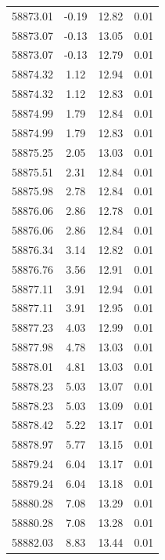 \begin{longtable}{|c|c|c|c|}
 58873.01 &   -0.19 &       12.82 &          0.01 \\
 58873.07 &   -0.13 &       13.05 &          0.01 \\
 58873.07 &   -0.13 &       12.79 &          0.01 \\
 58874.32 &    1.12 &       12.94 &          0.01 \\
 58874.32 &    1.12 &       12.83 &          0.01 \\
 58874.99 &    1.79 &       12.84 &          0.01 \\
 58874.99 &    1.79 &       12.83 &          0.01 \\
 58875.25 &    2.05 &       13.03 &          0.01 \\
 58875.51 &    2.31 &       12.84 &          0.01 \\
 58875.98 &    2.78 &       12.84 &          0.01 \\
 58876.06 &    2.86 &       12.78 &          0.01 \\
 58876.06 &    2.86 &       12.84 &          0.01 \\
 58876.34 &    3.14 &       12.82 &          0.01 \\
 58876.76 &    3.56 &       12.91 &          0.01 \\
 58877.11 &    3.91 &       12.94 &          0.01 \\
 58877.11 &    3.91 &       12.95 &          0.01 \\
 58877.23 &    4.03 &       12.99 &          0.01 \\
 58877.98 &    4.78 &       13.03 &          0.01 \\
 58878.01 &    4.81 &       13.03 &          0.01 \\
 58878.23 &    5.03 &       13.07 &          0.01 \\
 58878.23 &    5.03 &       13.09 &          0.01 \\
 58878.42 &    5.22 &       13.17 &          0.01 \\
 58878.97 &    5.77 &       13.15 &          0.01 \\
 58879.24 &    6.04 &       13.17 &          0.01 \\
 58879.24 &    6.04 &       13.18 &          0.01 \\
 58880.28 &    7.08 &       13.29 &          0.01 \\
 58880.28 &    7.08 &       13.28 &          0.01 \\
 58882.03 &    8.83 &       13.44 &          0.01 \\

\end{longtable}
